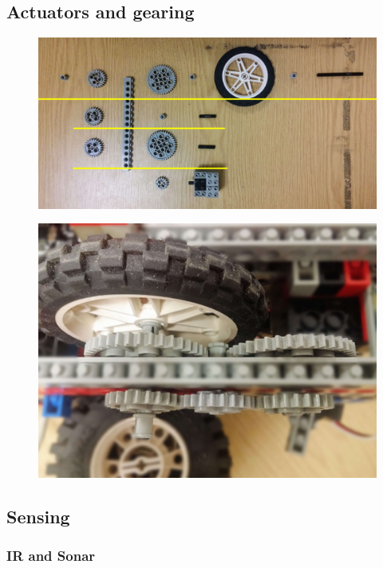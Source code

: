 
\subsection{Actuators and gearing}

\begin{figure}[ht]
    \centering
    \includegraphics[width=0.7\linewidth]{res/robot-pics/gear-train-unmounted.jpg}
    \caption{}
    \label{fig:}
\end{figure}

\begin{figure}[ht]
    \centering
    \includegraphics[width=0.7\linewidth]{res/robot-pics/gear-train-mounted.jpg}
    \caption{}
    \label{fig:}
\end{figure}


\subsection{Sensing}

\subsubsection{IR and Sonar}

